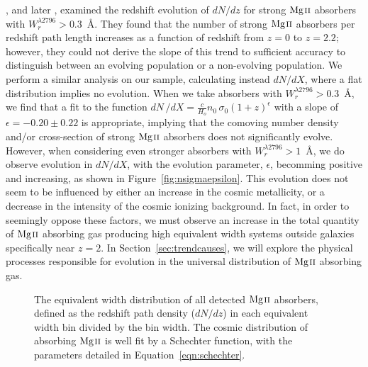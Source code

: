 \documentclass[iop,apj,numberedappendix,appendixfloats,twocolappendix]{emulateapj}
\begin{document}
\cite{Steidel1992}, and later \cite{Nestor2005}, examined the redshift evolution of $dN\!/dz$ for strong ${\hbox{{\rm Mg}\kern 0.1em{\sc ii}}}$ absorbers with $W_r^{\lambda2796} > 0.3$~{\AA}. They found that the number of strong ${\hbox{{\rm Mg}\kern 0.1em{\sc ii}}}$ absorbers per redshift path length increases as a function of redshift from $z = 0$ to $z = 2.2$; however, they could not derive the slope of this trend to sufficient accuracy to distinguish between an evolving population or a non-evolving population. We perform a similar analysis on our sample, calculating instead $dN\!/dX$, where a flat distribution implies no evolution. When we take absorbers with $W_r^{\lambda2796} > 0.3$~{\AA}, we find that a fit to the function $dN\,/dX = \frac{c}{H_o}n_0\,\sigma_0(1+z)^{\epsilon}$ with a slope of $\epsilon = -0.20 \pm 0.22$ is appropriate, implying that the comoving number density and/or cross-section of strong ${\hbox{{\rm Mg}\kern 0.1em{\sc ii}}}$ absorbers does not significantly evolve. However, when considering even stronger absorbers with $W_r^{\lambda2796} > 1$~{\AA}, we do observe evolution in $dN\!/dX$, with the evolution parameter, $\epsilon$, becomming positive and increasing, as shown in Figure~\ref{fig:nsigmaepsilon}. This evolution does not seem to be influenced by either an increase in the cosmic metallicity, or a decrease in the intensity of the cosmic ionizing background. In fact, in order to seemingly oppose these factors, we must observe an increase in the total quantity of ${\hbox{{\rm Mg}\kern 0.1em{\sc ii}}}$ absorbing gas producing high equivalent width systems outside galaxies specifically near $z = 2$. In Section~\ref{sec:trendcauses}, we will explore the physical processes responsible for evolution in the universal distribution of ${\hbox{{\rm Mg}\kern 0.1em{\sc ii}}}$ absorbing gas.

\begin{figure}[bth]
\caption{The equivalent width distribution of all detected ${\hbox{{\rm Mg}\kern 0.1em{\sc ii}}}$ absorbers, defined as the redshift path density ($dN\!/dz$) in each equivalent width bin divided by the bin width. The cosmic distribution of absorbing ${\hbox{{\rm Mg}\kern 0.1em{\sc ii}}}$ is well fit by a Schechter function, with the parameters detailed in Equation~\ref{eqn:schechter}.}
\label{fig:totalewdistro}
\end{figure}
\end{document}
